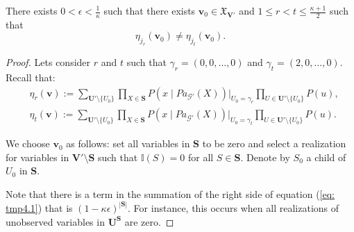 \documentclass[accepted]{uai2022}
\newenvironment{customlem}[1]{\renewcommand\thelemma{#1}\lemma}{\endlemma}
\newcommand{\Pa}[2]{\textit{Pa}_{#2}(#1)}
\newcommand{\V}[0]{\mathbf{V}}
\newcommand{\U}[0]{\mathbf{U}}
\newcommand{\G}[0]{\mathcal{G}}
\newcommand{\dom}[1]{\mathfrak{X}_{#1}}
\begin{document}
   \begin{customlem}{\ref{lem: eta index}}
        There exists $0<\epsilon<\frac{1}{\kappa}$ such that there exists $\mathbf{v}_0 \in \dom{\V'}$ and $1\leq r <t\leq \frac{\kappa+1}{2}$ such that 
        \begin{equation*}
            \eta_{j_r}(\mathbf{v}_0) \neq \eta_{j_t}(\mathbf{v}_0).
        \end{equation*}
    \end{customlem}
    \begin{proof}
        Lets consider $r$ and $t$ such that $\gamma_r = (0, 0, \dots, 0)$ and $\gamma_t = (2, 0, \dots, 0)$. Recall that:
        \begin{align}
            \label{eq: tmp4.1}
            & \eta_r(\mathbf{v}) :=\! \sum_{\U'\setminus \{U_0\}} \prod_{X \in \mathbf{S}} P(x \mid \Pa{X}{\G'})\Big|_{U_0=\gamma_r}\! \prod_{U\in \U'\setminus \{U_0\}}\! P(u), \\
            \label{eq: tmp4.2}
            & \eta_t(\mathbf{v}) :=\! \sum_{\U'\setminus \{U_0\}} \prod_{X \in \mathbf{S}} P(x \mid \Pa{X}{\G'})\Big|_{U_0=\gamma_t}\! \prod_{U\in \U'\setminus \{U_0\}}\! P(u).
        \end{align}
        
        We choose $\textbf{v}_0$ as follows: set all variables in $\mathbf{S}$ to be zero and select a realization for variables in $\V' \setminus \mathbf{S}$ such that $\mathbb{I}(S)=0$ for all $S \in \mathbf{S}$. 
        Denote by $S_0$ a child of $U_0$ in $\mathbf{S}$.
        
        Note that there is a term in the summation of the right side of equation (\ref{eq: tmp4.1}) that is $(1-\kappa\epsilon)^{|\mathbf{S}|}$. For instance, this occurs when all realizations of unobserved variables in $\U^{\mathbf{S}}$ are zero.
         

\end{proof}
\end{document}

